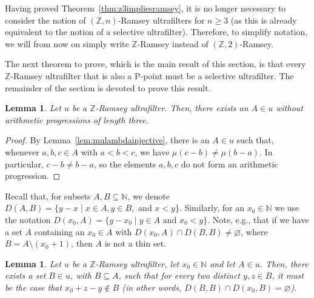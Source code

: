 \documentclass{amsart}
\newtheorem{lemma}[theorem]{Lemma}
\theoremstyle{definition}
\theoremstyle{remark}
\numberwithin{equation}{section}
\begin{document}
Having proved Theorem~\ref{thm:z3impliesramsey}, it is no longer necessary to consider the notion of $(\mathbb Z,n)$-Ramsey ultrafilters for $n\geq 3$ (as this is already equivalent to the notion of a selective ultrafilter). Therefore, to simplify notation, we will from now on simply write $\mathbb Z$-Ramsey instead of $(\mathbb Z,2)$-Ramsey.

The next theorem to prove, which is the main result of this section, is that every $\mathbb Z$-Ramsey ultrafilter that is also a P-point must be a selective ultrafilter. The remainder of the section is devoted to prove this result.

\begin{lemma}\label{Zramsey-no-arithmetic-progression}
    Let $u$ be a $\mathbb Z$-Ramsey ultrafilter. Then, there exists an $A\in u$ without arithmetic progressions of length three.
\end{lemma}

\begin{proof}
    By Lemma~\ref{lem:mulambdainjective}, there is an $A\in u$ such that, whenever $a,b,c\in A$ with $a<b<c$, we have $\mu(c-b)\neq\mu(b-a)$. In particular, $c-b\neq b-a$, so the elements $a,b,c$ do not form an arithmetic progression.
\end{proof}

Recall that, for subsets $A,B\subseteq\mathbb N$, we denote 
$D(A,B)=\{y-x\mid x\in A,y\in B,\text{ and }x<y\}$. Similarly, for an $x_0\in\mathbb N$ we use the notation $D(x_0,A)=\{y-x_0\mid y\in A\text{ and }x_0<y\}$. Note, e.g., that if we have a set $A$ containing an $x_0\in A$ with $D(x_0,A)\cap D(B,B)\neq\varnothing$, where $B=A\setminus(x_0+1)$, then $A$ is not a thin set.

\begin{lemma}\label{lemma:make-distances-injective}
    Let $u$ be a $\mathbb Z$-Ramsey ultrafilter, let $x_0\in\mathbb N$ and let $A\in u$. Then, there exists a set $B\in u$, with $B\subseteq A$, such that for every two distinct $y,z\in B$, it must be the case that $x_0+z-y\notin B$ (in other words, $D(B,B)\cap D(x_0,B)=\varnothing$).
\end{lemma}
\end{document}
